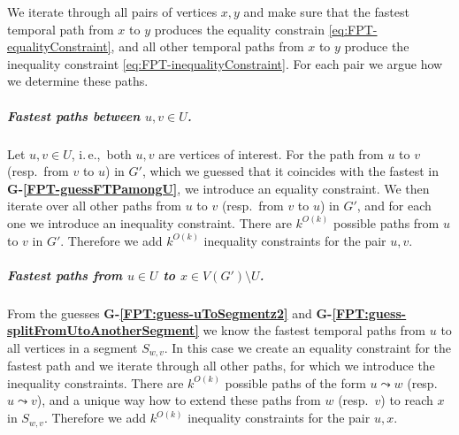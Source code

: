 \documentclass[a4paper,UKenglish,cleveref, autoref, thm-restate]{lipics-v2021}
\newcommand{\ie}{i.\,e.,\ }
\begin{document}
We iterate through all pairs of vertices $x,y$ and make sure that the fastest temporal path from $x$ to $y$ produces the equality constrain \cref{eq:FPT-equalityConstraint},
and all other temporal paths from $x$ to $y$ produce the inequality constraint \cref{eq:FPT-inequalityConstraint}.
For each pair we argue how we determine these paths.

\subparagraph{\boldmath Fastest paths between $u,v \in U$.}
Let $u,v\in U$, \ie both $u,v$ are vertices of interest.
For the path from $u$ to $v$ (resp.~from $v$ to $u$) in $G'$, which we guessed that it coincides with the fastest in \textcolor{lipicsGray}{\textsf{\textbf{G-\ref{FPT-guessFTPamongU}}}}, we introduce an equality constraint. 
We then iterate over all other paths from $u$ to $v$ (resp.~from $v$ to $u$) in $G'$, and for each one we introduce an inequality constraint.
There are $k^{O(k)}$ possible paths from $u$ to $v$ in $G'$. Therefore we add $k^{O(k)}$ inequality constraints for the pair $u,v$.

\subparagraph{\boldmath Fastest paths from $u \in U$ to $x \in V(G') \setminus U$.}
From the guesses \textcolor{lipicsGray}{\textsf{\textbf{G-\ref{FPT:guess-uToSegmentz2}}}} and \textcolor{lipicsGray}{\textsf{\textbf{G-\ref{FPT:guess-splitFromUtoAnotherSegment}}}} we know the fastest temporal paths from $u$ to all vertices in a segment $S_{w,v}$.
In this case we create an equality constraint for the fastest path and we 
iterate through all other paths, for which we introduce the inequality constraints.
There are $k^{O(k)}$ possible paths of the form $u \leadsto w$ (resp.~$u \leadsto v$),
and a unique way how to extend these paths from $w$ (resp.~$v$) to reach $x$ in $S_{w,v}$.
Therefore we add $k^{O(k)}$ inequality constraints for the pair $u,x$.
\end{document}
